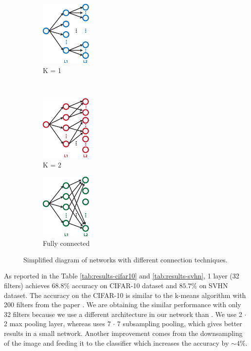 \documentclass{article} %
\begin{document}
\begin{figure}
        \centering
         \label{fig-secondconnex}
        \begin{subfigure}[b]{0.3\textwidth}
                \centering
                \includegraphics[width=1.0in]{fig-diagram-fanin1.eps}
                \caption{K = 1}
                \label{fig-secondconnex-fanin1}
        \end{subfigure}%
        ~%
          \begin{subfigure}[b]{0.3\textwidth}
                \centering
                \includegraphics[width=1.0in]{fig-diagram-fanin2.eps}
                \caption{K = 2}
                \label{fig-secondconnex-fanin2}                
        \end{subfigure}%
        \begin{subfigure}[b]{0.3\textwidth}
                \centering
                \includegraphics[width=1.0in]{fig-diagram-faninall.eps}
                \caption{Fully connected}
                \label{fig-secondconnex-full}
        \end{subfigure}
        \caption{Simplified diagram of networks with different connection techniques.}
\end{figure}


As reported in the Table \ref{tab:results-cifar10} and \ref{tab:results-svhn}, 1 layer (32 filters) achieves $68.8\%$ accuracy on CIFAR-10 dataset and $85.7\%$ on SVHN dataset.
The accuracy on the CIFAR-10 is similar to the k-means algorithm with 200 filters from the paper \cite{coates_analysis_2011}.
We are obtaining the similar performance with only 32 filters because we use a different architecture in our network than \cite{coates_analysis_2011}.
We use 2 $\cdot$ 2 max pooling layer, whereas \cite{coates_analysis_2011} uses 7 $\cdot$ 7 subsampling pooling, which gives better results in a small network.
Another improvement comes from the downsampling of the image and feeding it to the classifier which increases the accuracy by  $\sim 4\%$. 
\end{document}
